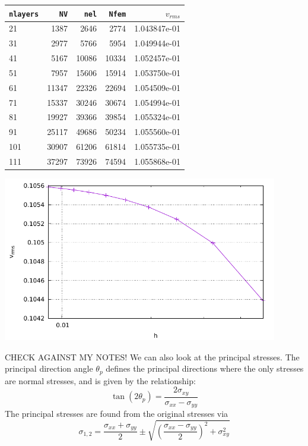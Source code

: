 \begin{center}
\begin{tabular}{lrrrr}
\hline
{\tt nlayers} & {\tt NV} & {\tt nel} & {\tt Nfem} & $v_{rms}$\\
\hline
\hline
21  &  1387 &  2646 &  2774 & 1.043847e-01\\ 
31  &  2977 &  5766 &  5954 & 1.049944e-01\\
41  &  5167 & 10086 & 10334 & 1.052457e-01\\
51  &  7957 & 15606 & 15914 & 1.053750e-01\\
61  & 11347 & 22326 & 22694 & 1.054509e-01\\
71  & 15337 & 30246 & 30674 & 1.054994e-01\\
81  & 19927 & 39366 & 39854 & 1.055324e-01\\
91  & 25117 & 49686 & 50234 & 1.055560e-01\\
101 & 30907 & 61206 & 61814 & 1.055735e-01\\
111 & 37297 & 73926 & 74594 & 1.055868e-01\\
\hline
\end{tabular}

\includegraphics[width=12cm]{python_codes/fieldstone_58/results/vrms}
\end{center}


CHECK AGAINST MY NOTES!
We can also look at the principal stresses.
The principal direction angle $\theta_p$ defines the principal
directions where the only stresses are normal stresses, and 
is given by the relationship:
\[
\tan (2\theta_p) =  \frac{2 \sigma_{xy}}{\sigma_{xx} -\sigma_{yy}}
\]
The principal stresses are found from the original stresses via
 \[
\sigma_{1,2}=\frac{\sigma_{xx}+\sigma_{yy}}{2} \pm \sqrt{  \left(\frac{\sigma_{xx}-\sigma_{yy}}{2}\right)^2 +\sigma_{xy}^2 }
 \]





